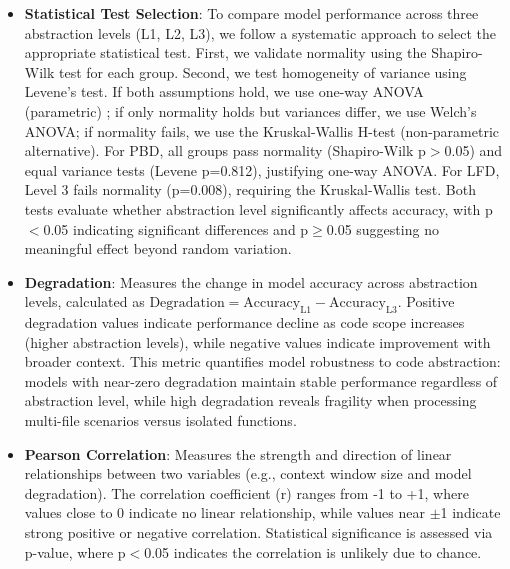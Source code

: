 \documentclass[lettersize,journal]{IEEEtran}
\begin{document}
\begin{itemize}
    \item \textbf{Statistical Test Selection}: To compare model performance across three abstraction levels (L1, L2, L3), we follow a systematic approach to select the appropriate statistical test. First, we validate normality using the Shapiro-Wilk \cite{shapiro1965analysis} test for each group. Second, we test homogeneity of variance using Levene's test. If both assumptions hold, we use one-way ANOVA (parametric) \cite{fisher1970statistical}; if only normality holds but variances differ, we use Welch's ANOVA; if normality fails, we use the Kruskal-Wallis H-test (non-parametric alternative). For PBD, all groups pass normality (Shapiro-Wilk p$>$0.05) and equal variance tests (Levene p=0.812), justifying one-way ANOVA. For LFD, Level 3 fails normality (p=0.008), requiring the Kruskal-Wallis test. Both tests evaluate whether abstraction level significantly affects accuracy, with p$<$0.05 indicating significant differences and p$\geq$0.05 suggesting no meaningful effect beyond random variation.
    
    \item \textbf{Degradation}: Measures the change in model accuracy across abstraction levels, calculated as $\text{Degradation} = \text{Accuracy}_{\text{L1}} - \text{Accuracy}_{\text{L3}}$. Positive degradation values indicate performance decline as code scope increases (higher abstraction levels), while negative values indicate improvement with broader context. This metric quantifies model robustness to code abstraction: models with near-zero degradation maintain stable performance regardless of abstraction level, while high degradation reveals fragility when processing multi-file scenarios versus isolated functions.

    \item \textbf{Pearson Correlation}: Measures the strength and direction of linear relationships between two variables (e.g., context window size and model degradation). The correlation coefficient (r) ranges from -1 to +1, where values close to 0 indicate no linear relationship, while values near $\pm$1 indicate strong positive or negative correlation. Statistical significance is assessed via p-value, where p$<$0.05 indicates the correlation is unlikely due to chance.


\end{itemize}
\end{document}
